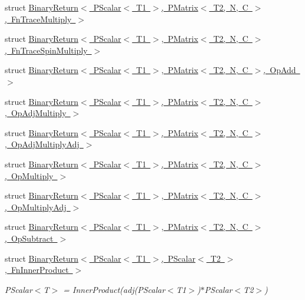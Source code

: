 \begin{DoxyCompactItemize}
\item 
struct \mbox{\hyperlink{structENSEM_1_1BinaryReturn_3_01PScalar_3_01T1_01_4_00_01PMatrix_3_01T2_00_01N_00_01C_01_4_00_01FnTraceMultiply_01_4}{Binary\+Return$<$ P\+Scalar$<$ T1 $>$, P\+Matrix$<$ T2, N, C $>$, Fn\+Trace\+Multiply $>$}}
\item 
struct \mbox{\hyperlink{structENSEM_1_1BinaryReturn_3_01PScalar_3_01T1_01_4_00_01PMatrix_3_01T2_00_01N_00_01C_01_4_00_01FnTraceSpinMultiply_01_4}{Binary\+Return$<$ P\+Scalar$<$ T1 $>$, P\+Matrix$<$ T2, N, C $>$, Fn\+Trace\+Spin\+Multiply $>$}}
\item 
struct \mbox{\hyperlink{structENSEM_1_1BinaryReturn_3_01PScalar_3_01T1_01_4_00_01PMatrix_3_01T2_00_01N_00_01C_01_4_00_01OpAdd_01_4}{Binary\+Return$<$ P\+Scalar$<$ T1 $>$, P\+Matrix$<$ T2, N, C $>$, Op\+Add $>$}}
\item 
struct \mbox{\hyperlink{structENSEM_1_1BinaryReturn_3_01PScalar_3_01T1_01_4_00_01PMatrix_3_01T2_00_01N_00_01C_01_4_00_01OpAdjMultiply_01_4}{Binary\+Return$<$ P\+Scalar$<$ T1 $>$, P\+Matrix$<$ T2, N, C $>$, Op\+Adj\+Multiply $>$}}
\item 
struct \mbox{\hyperlink{structENSEM_1_1BinaryReturn_3_01PScalar_3_01T1_01_4_00_01PMatrix_3_01T2_00_01N_00_01C_01_4_00_01OpAdjMultiplyAdj_01_4}{Binary\+Return$<$ P\+Scalar$<$ T1 $>$, P\+Matrix$<$ T2, N, C $>$, Op\+Adj\+Multiply\+Adj $>$}}
\item 
struct \mbox{\hyperlink{structENSEM_1_1BinaryReturn_3_01PScalar_3_01T1_01_4_00_01PMatrix_3_01T2_00_01N_00_01C_01_4_00_01OpMultiply_01_4}{Binary\+Return$<$ P\+Scalar$<$ T1 $>$, P\+Matrix$<$ T2, N, C $>$, Op\+Multiply $>$}}
\item 
struct \mbox{\hyperlink{structENSEM_1_1BinaryReturn_3_01PScalar_3_01T1_01_4_00_01PMatrix_3_01T2_00_01N_00_01C_01_4_00_01OpMultiplyAdj_01_4}{Binary\+Return$<$ P\+Scalar$<$ T1 $>$, P\+Matrix$<$ T2, N, C $>$, Op\+Multiply\+Adj $>$}}
\item 
struct \mbox{\hyperlink{structENSEM_1_1BinaryReturn_3_01PScalar_3_01T1_01_4_00_01PMatrix_3_01T2_00_01N_00_01C_01_4_00_01OpSubtract_01_4}{Binary\+Return$<$ P\+Scalar$<$ T1 $>$, P\+Matrix$<$ T2, N, C $>$, Op\+Subtract $>$}}
\item 
struct \mbox{\hyperlink{structENSEM_1_1BinaryReturn_3_01PScalar_3_01T1_01_4_00_01PScalar_3_01T2_01_4_00_01FnInnerProduct_01_4}{Binary\+Return$<$ P\+Scalar$<$ T1 $>$, P\+Scalar$<$ T2 $>$, Fn\+Inner\+Product $>$}}
\begin{DoxyCompactList}\small\item\em P\+Scalar$<$\+T$>$ = Inner\+Product(adj(\+P\+Scalar$<$\+T1$>$)$\ast$\+P\+Scalar$<$\+T2$>$) \end{DoxyCompactList}\item 

\end{DoxyCompactItemize}
